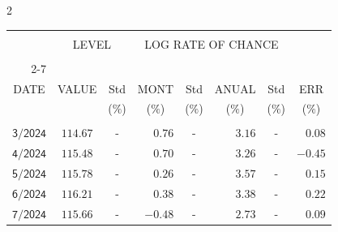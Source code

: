 \begin{multicols}{2}{ 
\begin{tabular}{rccrcrcr} 
\hline 
 \multicolumn{1}{|c|}{}  &  \multicolumn{2}{c|}{} & 
\multicolumn{4}{c}{} & \multicolumn{1}{|c|}{}\vspace{-.10in}\\ 
\multicolumn{1}{|c|}{}  &  \multicolumn{2}{c|}{LEVEL} & 
\multicolumn{4}{c}{LOG RATE OF CHANCE} & \multicolumn{1}{|c|}{}    \\  
\multicolumn{1}{|c|}{}  &  \multicolumn{2}{c|}{} & 
\multicolumn{4}{c}{} & \multicolumn{1}{|c|}{}\vspace{-.10in}\\ \cline{2-7} 
\multicolumn{1}{|c|}{ } &\multicolumn{1}{c|}{ } & \multicolumn{1}{c|}{} & \multicolumn{1}{c|}{} & \multicolumn{1}{c|}{}     & \multicolumn{1}{c|}{} & \multicolumn{1}{c|}{}  & \multicolumn{1}{c|}{}  \vspace{-.05in}\\  
\multicolumn{1}{|c|}{DATE } &\multicolumn{1}{c|}{ VALUE} & \multicolumn{1}{c|}{Std} & \multicolumn{1}{c|}{MONT} & \multicolumn{1}{c|}{Std}     & \multicolumn{1}{c|}{ANUAL} & \multicolumn{1}{c|}{Std}  & \multicolumn{1}{c|}{ERR}\\  
\multicolumn{1}{|c|}{ }      & \multicolumn{1}{c|}{  }    & \multicolumn{1}{c|}{($\%$)}&  \multicolumn{1}{c|}{($\%$)  }  & \multicolumn{1}{c|}{($\%$)} & \multicolumn{1}{c|}{($\%$) }     & \multicolumn{1}{c|}{ ($\%$) }  &  \multicolumn{1}{c|}{ ($\%$) } \\  
 \hline 
 \\$\mathsf{       3/2024}$ &$\mathsf{   114.67}$ &     - &$\mathsf{    0.76}$ &     - &$\mathsf{     3.16 }$ &     - &$\mathsf{   0.08} $ \vspace{-.005in}\\ 
$\mathsf{       4/2024}$ &$\mathsf{   115.48}$ &     - &$\mathsf{    0.70}$ &     - &$\mathsf{     3.26 }$ &     - &$\mathsf{  -0.45} $ \vspace{-.005in}\\ 
$\mathsf{       5/2024}$ &$\mathsf{   115.78}$ &     - &$\mathsf{    0.26}$ &     - &$\mathsf{     3.57 }$ &     - &$\mathsf{   0.15} $ \vspace{-.005in}\\ 
$\mathsf{       6/2024}$ &$\mathsf{   116.21}$ &     - &$\mathsf{    0.38}$ &     - &$\mathsf{     3.38 }$ &     - &$\mathsf{   0.22} $ \vspace{-.005in}\\ 
$\mathsf{       7/2024}$ &$\mathsf{   115.66}$ &     - &$\mathsf{   -0.48}$ &     - &$\mathsf{     2.73 }$ &     - &$\mathsf{   0.09} $ \vspace{-.005in}\\ 

\end{tabular}}
\end{multicols}
